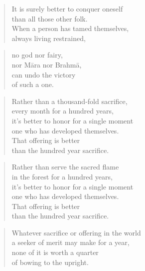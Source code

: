 \documentclass[12pt,openany]{book}%
\begin{document}
\begin{verse}%
It is surely better to conquer oneself \\
than all those other folk. \\
When a person has tamed themselves, \\
always living restrained, 

%
\end{verse}

\begin{verse}%
no god nor fairy, \\
nor \textsanskrit{Māra} nor \textsanskrit{Brahmā}, \\
can undo the victory \\
of such a one. 

%
\end{verse}

\begin{verse}%
Rather than a thousand-fold sacrifice, \\
every month for a hundred years, \\
it’s better to honor for a single moment \\
one who has developed themselves. \\
That offering is better \\
than the hundred year sacrifice. 

%
\end{verse}

\begin{verse}%
Rather than serve the sacred flame \\
in the forest for a hundred years, \\
it’s better to honor for a single moment \\
one who has developed themselves. \\
That offering is better \\
than the hundred year sacrifice. 

%
\end{verse}

\begin{verse}%
Whatever sacrifice or offering in the world \\
a seeker of merit may make for a year, \\
none of it is worth a quarter \\
of bowing to the upright. 

%
\end{verse}
\end{document}
